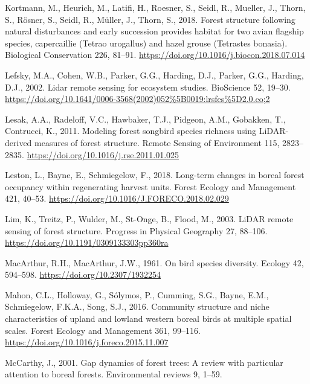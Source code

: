 \documentclass[
  12pt,
]{article}
\newlength{\cslhangindent}
\newlength{\cslentryspacingunit} %
\newenvironment{CSLReferences}[2] %
 {%
  \setlength{\parindent}{0pt}
  \ifodd #1
  \let\oldpar\par
  \def\par{\hangindent=\cslhangindent\oldpar}
  \fi
  \setlength{\parskip}{#2\cslentryspacingunit}
 }%
 {}
\begin{document}
\begin{CSLReferences}{1}{0}
\leavevmode{}%
Kortmann, M., Heurich, M., Latifi, H., Roesner, S., Seidl, R., Mueller, J., Thorn, S., Rösner, S., Seidl, R., Müller, J., Thorn, S., 2018. Forest structure following natural disturbances and early succession provides habitat for two avian flagship species, capercaillie ({Tetrao} urogallus) and hazel grouse ({Tetrastes} bonasia). Biological Conservation 226, 81--91. \url{https://doi.org/10.1016/j.biocon.2018.07.014}

\leavevmode{}%
Lefsky, M.A., Cohen, W.B., Parker, G.G., Harding, D.J., Parker, G.G., Harding, D.J., 2002. Lidar remote sensing for ecosystem studies. BioScience 52, 19--30. \url{https://doi.org/10.1641/0006-3568(2002)052\%5B0019:lrsfes\%5D2.0.co;2}

\leavevmode{}%
Lesak, A.A., Radeloff, V.C., Hawbaker, T.J., Pidgeon, A.M., Gobakken, T., Contrucci, K., 2011. Modeling forest songbird species richness using {LiDAR}-derived measures of forest structure. Remote Sensing of Environment 115, 2823--2835. \url{https://doi.org/10.1016/j.rse.2011.01.025}

\leavevmode{}%
Leston, L., Bayne, E., Schmiegelow, F., 2018. Long-term changes in boreal forest occupancy within regenerating harvest units. Forest Ecology and Management 421, 40--53. \url{https://doi.org/10.1016/J.FORECO.2018.02.029}

\leavevmode{}%
Lim, K., Treitz, P., Wulder, M., St-Onge, B., Flood, M., 2003. {LiDAR} remote sensing of forest structure. Progress in Physical Geography 27, 88--106. \url{https://doi.org/10.1191/0309133303pp360ra}

\leavevmode{}%
MacArthur, R.H., MacArthur, J.W., 1961. On bird species diversity. Ecology 42, 594--598. \url{https://doi.org/10.2307/1932254}

\leavevmode{}%
Mahon, C.L., Holloway, G., Sólymos, P., Cumming, S.G., Bayne, E.M., Schmiegelow, F.K.A., Song, S.J., 2016. Community structure and niche characteristics of upland and lowland western boreal birds at multiple spatial scales. Forest Ecology and Management 361, 99--116. \url{https://doi.org/10.1016/j.foreco.2015.11.007}

\leavevmode{}%
McCarthy, J., 2001. Gap dynamics of forest trees: A review with particular attention to boreal forests. Environmental reviews 9, 1--59.


\end{CSLReferences}
\end{document}
